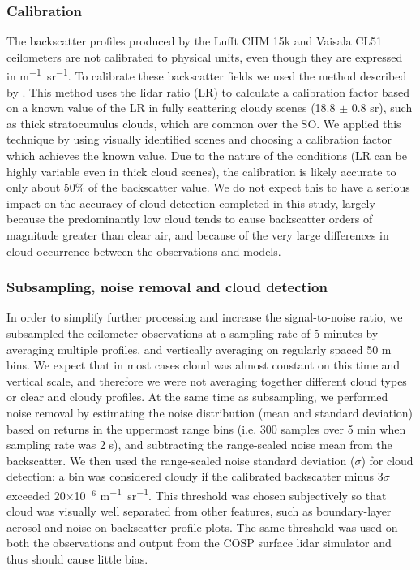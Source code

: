 \subsubsection{Calibration}
\label{sec:calibration}

The backscatter profiles produced by the Lufft CHM 15k and Vaisala CL51
ceilometers are not calibrated to physical units, even though they are expressed
in \unit{m^{-1} sr^{-1}}. To calibrate these backscatter fields we used the
method described by \cite{oconnor2004}. This method uses the lidar ratio (LR) to
calculate a calibration factor based on a known value of the LR in fully
scattering cloudy scenes (18.8 $\pm$ 0.8 \unit{sr}), such as thick stratocumulus
clouds, which are common over the SO. We applied this technique by using
visually identified scenes and choosing a calibration factor which achieves the
known value. Due to the nature of the conditions (LR can be highly variable even
in thick cloud scenes), the calibration is likely accurate to only about 50\% of
the backscatter value. We do not expect this to have a serious impact on the
accuracy of cloud detection completed in this study, largely because the
predominantly low cloud tends to cause backscatter orders of magnitude greater
than clear air, and because of the very large differences in cloud occurrence
between the observations and models.

\subsubsection{Subsampling, noise removal and cloud detection}
\label{sec:subsampling}

In order to simplify further processing and increase the signal-to-noise ratio,
we subsampled the ceilometer observations at a sampling rate of 5 minutes by
averaging multiple profiles, and vertically averaging on regularly spaced 50
\unit{m} bins. We expect that in most cases cloud was almost constant on this
time and vertical scale, and therefore we were not averaging together different
cloud types or clear and cloudy profiles. At the same time as subsampling, we
performed noise removal by estimating the noise distribution (mean and standard
deviation) based on returns in the uppermost range bins (i.e. 300 samples over 5
min when sampling rate was 2 \unit{s}), and subtracting the range-scaled noise
mean from the backscatter. We then used the range-scaled noise standard
deviation ($\sigma$) for cloud detection: a bin was considered cloudy if the
calibrated backscatter minus 3$\sigma$ exceeded 20$\times$10$^{-6}$ \unit{m^{-1}
sr^{-1}}. This threshold was chosen subjectively so that cloud was visually well
separated from other features, such as boundary-layer aerosol and noise on
backscatter profile plots. The same threshold was used on both the observations
and output from the COSP surface lidar simulator and thus should cause little
bias.

